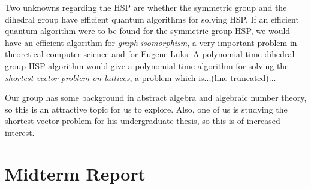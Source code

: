 \documentclass[12pt]{article}
\theoremstyle{plain}
\theoremstyle{definition}
\begin{document}
Two unknowns regarding the HSP are whether the symmetric group and the dihedral group have efficient quantum algorithms for solving HSP. If an efficient quantum algorithm were to be found for the symmetric group HSP, we would have an efficient algorithm for \emph{graph isomorphism}, a very important problem in theoretical computer science and for Eugene Luks. A polynomial time dihedral group HSP algorithm would give a polynomial time algorithm for solving the \emph{shortest vector problem on lattices}, a problem which is...(line truncated)...

Our group has some background in abstract algebra and algebraic number theory, so this is an attractive topic for us to explore. Also, one of us is studying the shortest vector problem for his undergraduate thesis, so this is of increased interest.\\
%

%
\section{Midterm Report}


\end{document}

